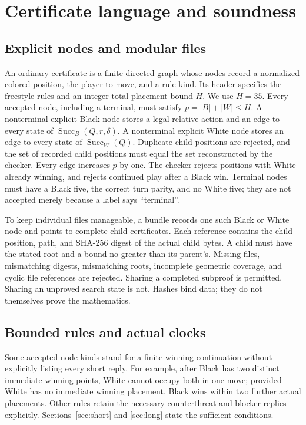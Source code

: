 \documentclass[11pt]{article}
\theoremstyle{definition}
\theoremstyle{remark}
\newcommand{\Succ}{\operatorname{Succ}}
\begin{document}
\section{Certificate language and soundness}
\label{sec:cert}
\subsection{Explicit nodes and modular files}
An ordinary certificate is a finite directed graph whose nodes record a
normalized colored position, the player to move, and a rule kind. Its
header specifies the freestyle rules and an integer total-placement bound
$H$. We use $H=35$. Every accepted node, including a terminal, must
satisfy $p=|B|+|W|\le H$. A nonterminal explicit Black node stores a legal
relative action and an edge to every state of
$\Succ_B(Q,r,\delta)$. A nonterminal explicit White node stores an edge
to every state of $\Succ_W(Q)$. Duplicate child positions are rejected,
and the set of recorded child positions must equal the set reconstructed
by the checker. Every edge increases $p$ by one. The checker rejects
positions with White already winning, and rejects continued play after a
Black win. Terminal nodes must have a Black five, the correct turn parity,
and no White five; they are not accepted merely because a label says
``terminal''.

To keep individual files manageable, a bundle records one such Black or
White node and points to complete child certificates. Each reference
contains the child position, path, and SHA-256 digest of the actual child
bytes. A child must have the stated root and a bound no greater than its
parent's. Missing files, mismatching digests, mismatching roots, incomplete
geometric coverage, and cyclic file references are rejected. Sharing a
completed subproof is permitted. Sharing an unproved search state is not.
Hashes bind data; they do not themselves prove the mathematics.

\subsection{Bounded rules and actual clocks}
Some accepted node kinds stand for a finite winning continuation without
explicitly listing every short reply. For example, after Black has two
distinct immediate winning points, White cannot occupy both in one move;
provided White has no immediate winning placement, Black wins within two
further actual placements. Other rules retain the necessary counterthreat
and blocker replies explicitly. Sections~\ref{sec:short} and
\ref{sec:long} state the sufficient conditions.
\end{document}
